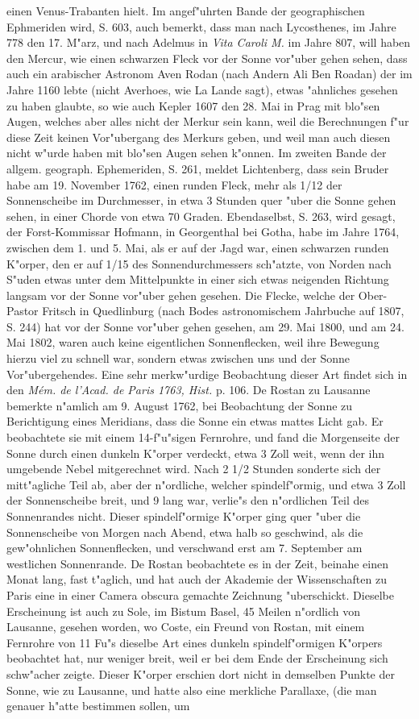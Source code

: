 \documentclass[a4paper, 11pt, oneside, polutonikogreek, german]{article}
\begin{document}
einen Venus-Trabanten hielt. Im angef"uhrten Bande der geographischen Ephmeriden wird, S. 603, auch bemerkt, dass man nach Lycosthenes, im Jahre 778 den 17. M"arz, und nach Adelmus in \emph{Vita Caroli M.} im Jahre 807, will haben den Mercur, wie einen schwarzen Fleck vor der Sonne vor"uber gehen sehen, dass auch ein arabischer Astronom Aven Rodan (nach Andern Ali Ben Roadan) der im Jahre 1160 lebte (nicht Averhoes, wie La Lande sagt), etwas "ahnliches gesehen zu haben glaubte, so wie auch Kepler 1607 den 28. Mai in Prag mit blo"sen Augen, welches aber alles nicht der Merkur sein kann, weil die Berechnungen f"ur diese Zeit keinen Vor"ubergang des Merkurs geben, und weil man auch diesen nicht w"urde haben mit blo"sen Augen sehen k"onnen. Im zweiten Bande der allgem. geograph. Ephemeriden, S. 261, meldet Lichtenberg, dass sein Bruder habe am 19. November 1762, einen runden Fleck, mehr als 1/12 der Sonnenscheibe im Durchmesser, in etwa 3 Stunden quer "uber die Sonne gehen sehen, in einer Chorde von etwa 70 Graden. Ebendaselbst, S. 263, wird gesagt, der Forst-Kommissar Hofmann, in Georgenthal bei Gotha, habe im Jahre 1764, zwischen dem 1. und 5. Mai, als er auf der Jagd war, einen schwarzen runden K"orper, den er auf 1/15 des Sonnendurchmessers sch"atzte, von Norden nach S"uden etwas unter dem Mittelpunkte in einer sich etwas neigenden Richtung langsam vor der Sonne vor"uber gehen gesehen. Die Flecke, welche der Ober-Pastor Fritsch in Quedlinburg (nach Bodes astronomischem Jahrbuche auf 1807, S. 244) hat vor der Sonne vor"uber gehen gesehen, am 29. Mai 1800, und am 24. Mai 1802, waren auch keine eigentlichen Sonnenflecken, weil ihre Bewegung hierzu viel zu schnell war, sondern etwas zwischen uns und der Sonne Vor"ubergehendes. Eine sehr merkw"urdige Beobachtung dieser Art findet sich in den \emph{Mém. de l'Acad. de Paris 1763, Hist.} p. 106. De Rostan zu Lausanne bemerkte n"amlich am 9. August 1762, bei Beobachtung der Sonne zu Berichtigung eines Meridians, dass die Sonne ein etwas mattes Licht gab. Er beobachtete sie mit einem 14-f"u"sigen Fernrohre, und fand die Morgenseite der Sonne durch einen dunkeln K"orper verdeckt, etwa 3 Zoll weit, wenn der ihn umgebende Nebel mitgerechnet wird. Nach 2 1/2 Stunden sonderte sich der mitt"agliche Teil ab, aber der n"ordliche, welcher spindelf"ormig, und etwa 3 Zoll der Sonnenscheibe breit, und 9 lang war, verlie"s den n"ordlichen Teil des Sonnenrandes nicht. Dieser spindelf"ormige K"orper ging quer "uber die Sonnenscheibe von Morgen nach Abend, etwa halb so geschwind, als die gew"ohnlichen Sonnenflecken, und verschwand erst am 7. September am westlichen Sonnenrande. De Rostan beobachtete es in der Zeit, beinahe einen Monat lang, fast t"aglich, und hat auch der Akademie der Wissenschaften zu Paris eine in einer Camera obscura gemachte Zeichnung "uberschickt. Dieselbe Erscheinung ist auch zu Sole, im Bistum Basel, 45 Meilen n"ordlich von Lausanne, gesehen worden, wo Coste, ein Freund von Rostan, mit einem Fernrohre von 11 Fu"s dieselbe Art eines dunkeln spindelf"ormigen K"orpers beobachtet hat, nur weniger breit, weil er bei dem Ende der Erscheinung sich schw"acher zeigte. Dieser K"orper erschien dort nicht in demselben Punkte der Sonne, wie zu Lausanne, und hatte also eine merkliche Parallaxe, (die man genauer h"atte bestimmen sollen, um 
\end{document}
